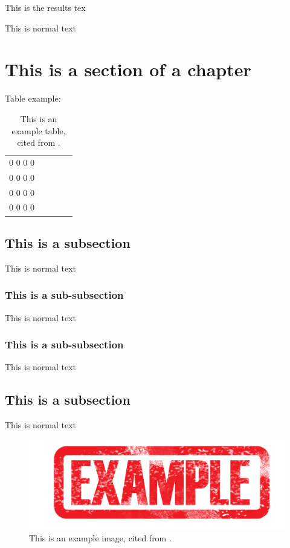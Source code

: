 \documentclass[../uniLu_template.tex]{subfiles}
\begin{document}
This is the results tex 

This is normal text
\section{This is a section of a chapter}

Table example:
\begin{table}[h]
\caption[Example table]{This is an example table, cited from \cite{example_article}.}
\centering
\begin{tabular}{lllll}
 0  0  0  0  \\
 0  0  0  0  \\
 0  0  0  0  \\
 0  0  0  0 
\end{tabular}
\end{table}
\label{example_table}

\subsection{This is a subsection}
This is normal text
\subsubsection{This is a sub-subsection}
This is normal text
\subsubsection{This is a sub-subsection}
This is normal text
\subsection{This is a subsection}
This is normal text
\begin{figure}[h]
\includegraphics[width=1\columnwidth]{./Figures/results/example.png}
\caption[Example image]{This is an example image, cited from \cite{example_article}.}
\label{example_label}
\centering
\end{figure}
\end{document}
